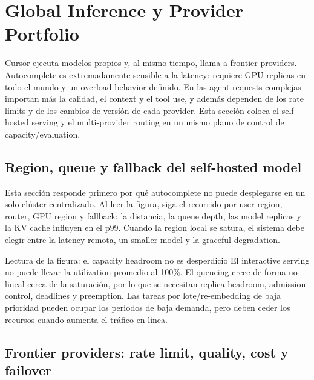 \section{Global Inference y Provider Portfolio}

Cursor ejecuta modelos propios y, al mismo tiempo, llama a frontier providers. Autocomplete es extremadamente sensible a la latency: requiere GPU replicas en todo el mundo y un overload behavior definido. En las agent requests complejas importan más la calidad, el context y el tool use, y además dependen de los rate limits y de los cambios de versión de cada provider. Esta sección coloca el self-hosted serving y el multi-provider routing en un mismo plano de control de capacity/evaluation.

\subsection{Region, queue y fallback del self-hosted model}

Esta sección responde primero por qué autocomplete no puede desplegarse en un solo clúster centralizado. Al leer la figura, siga el recorrido por user region, router, GPU region y fallback: la distancia, la queue depth, las model replicas y la KV cache influyen en el p99. Cuando la region local se satura, el sistema debe elegir entre la latency remota, un smaller model y la graceful degradation.


\begin{knowledgebox}{Lectura de la figura: el capacity headroom no es desperdicio}
El interactive serving no puede llevar la utilization promedio al 100\%. El queueing crece de forma no lineal cerca de la saturación, por lo que se necesitan replica headroom, admission control, deadlines y preemption. Las tareas por lote/re-embedding de baja prioridad pueden ocupar los periodos de baja demanda, pero deben ceder los recursos cuando aumenta el tráfico en línea.
\end{knowledgebox}

\subsection{Frontier providers: rate limit, quality, cost y failover}

